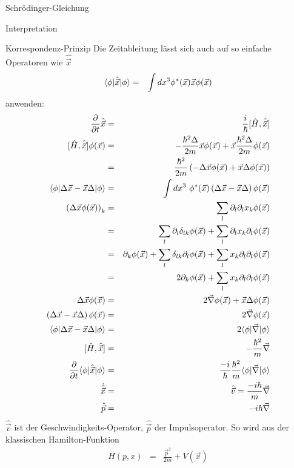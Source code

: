 \begin{chapter}{\titlestr}
\begin{section}{Schrödinger-Gleichung}
\begin{subsection}{Interpretation}
\begin{subsubsection}{Korrespondenz-Prinzip}
Die Zeitableitung lässt sich auch auf so einfache Operatoren wie $\hat{\vec{x}}$
\begin{eqnarray*}
\langle\phi\rvert\hat{\vec{x}}\lvert\phi\rangle &=& \int dx^3 \phi^*(\vec{x})\vec{x}\phi(\vec{x})
\end{eqnarray*}
anwenden:
\begin{eqnarray*}
\frac{\partial}{\partial t}\hat{\vec{x}} &=&\frac{i}{\hbar}[\hat{H},\hat{\vec{x}}]\cr
[\hat{H},\hat{\vec{x}}]\phi(\vec{x}) &=& -\frac{\hbar^2\Delta}{2m}\vec{x}\phi(\vec{x})
+\vec{x}\frac{\hbar^2\Delta}{2m}\phi(\vec{x})\\
&=& \frac{\hbar^2}{2m}\left(-\Delta\vec{x}\phi(\vec{x})+\vec{x}\Delta\phi(\vec{x})\right)\\
\bra{\phi}\Delta\vec{x}-\vec{x}\Delta\ket{\phi}&=&\int dx^3\ \phi^*(\vec{x})\left(\Delta\vec{x}-\vec{x}\Delta\right)\phi(\vec{x})\\
\left(\Delta\vec{x}\phi(\vec{x})\right)_k &=& \sum_l\partial_l\partial_lx_k\phi(\vec{x})\\
&=& \sum_l\partial_l\delta_{lk}\phi(\vec{x})+\sum_l\partial_lx_k\partial_l\phi(\vec{x})\\
&=& \partial_k\phi(\vec{x})+\sum_l\delta_{lk}\partial_l\phi(\vec{x})+\sum_lx_k\partial_l\partial_l\phi(\vec{x})\\
&=& 2\partial_k\phi(\vec{x})+\sum_lx_k\partial_l\partial_l\phi(\vec{x})\\
\Delta\vec{x}\phi(\vec{x}) &=& 2\vec{\nabla}\phi(\vec{x})+\vec{x}\Delta\phi(\vec{x})\\
\left(\Delta\vec{x}-\vec{x}\Delta\right)\phi(\vec{x}) &=& 2\vec{\nabla}\phi(\vec{x})\\
\bra{\phi}\Delta\vec{x}-\vec{x}\Delta\ket{\phi}&=&2\bra{\phi}\vec{\nabla}\ket{\phi}\cr
[\hat{H},\hat{\vec{x}}] &=& -\frac{\hbar^2}{m}\vec{\nabla}\\
\frac{\partial}{\partial t}\bra{\phi}\hat{\vec{x}}\ket{\phi} &=& \frac{-i}{\hbar}\frac{\hbar^2}{m}\bra{\phi}\vec{\nabla}\ket{\phi}\\
\dot{\hat{\vec{x}}} &=& \hat{\vec{v}}  = \frac{-i\hbar}{m}\vec{\nabla}\\
\hat{\vec{p}} &=& -i\hbar\vec{\nabla}
\end{eqnarray*}
$\hat{\vec{v}}$ ist der Geschwindigkeits-Operator, $\hat{\vec{p}}$ der Impulsoperator. So wird aus der klassischen Hamilton-Funktion
\begin{eqnarray*}
H(p,x) &=& \frac{\vec{p}^2}{2m}+V(\vec{x})
\end{eqnarray*}

\end{subsubsection}
\end{subsection}
\end{section}
\end{chapter}
